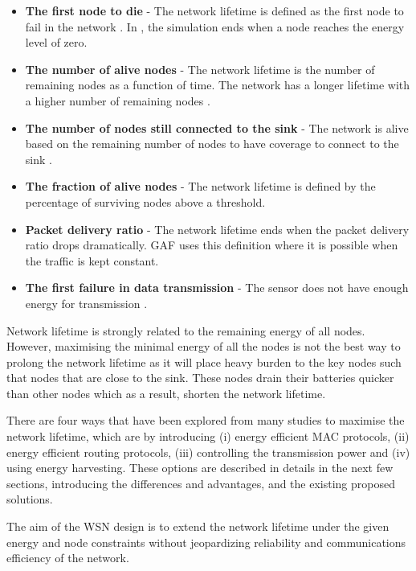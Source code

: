 \begin{itemize}
\item \textbf{The first node to die} - The network lifetime is defined as the first node to fail in the network \cite{maxmin, erapl}. In \cite{lifetimedef1}, the simulation ends when a node reaches the energy level of zero.

\item \textbf{The number of alive nodes} - The network lifetime is the number of remaining nodes as a function of time. The network has a longer lifetime with a higher number of remaining nodes \cite{lifetimedef2, smecn}.

\item \textbf{The number of nodes still connected to the sink} - The network is alive based on the remaining number of nodes to have coverage to connect to the sink \cite{smecn}.

\item \textbf{The fraction of alive nodes} - The network lifetime is defined by the percentage of surviving nodes above a threshold.

\item \textbf{Packet delivery ratio} - The network lifetime ends when the packet delivery ratio drops dramatically. GAF \cite{gaf} uses this definition where it is possible when the traffic is kept constant.

\item \textbf{The first failure in data transmission} - The sensor does not have enough energy for transmission \cite{maxmin}.
\end{itemize}


Network lifetime is strongly related to the remaining energy of all nodes. However, maximising the minimal energy of all the nodes is not the best way to prolong the network lifetime as it will place heavy burden to the key nodes such that nodes that are close to the sink. These nodes drain their batteries quicker than other nodes which as a result, shorten the network lifetime.

There are four ways that have been explored from many studies to maximise the network lifetime, which are by introducing (i) energy efficient MAC protocols, (ii) energy efficient routing protocols, (iii) controlling the transmission power and (iv) using energy harvesting. These options are described in details in the next few sections, introducing the differences and advantages, and the existing proposed solutions.

The aim of the WSN design is to extend the network lifetime under the given energy and node constraints without jeopardizing reliability and communications efficiency of the network.

